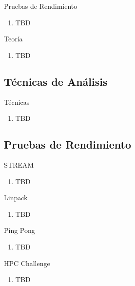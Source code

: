 \documentclass{beamer}
\begin{document}
\begin{frame}{Pruebas de Rendimiento}
	\begin{enumerate}
	\item TBD 
	\end{enumerate}
\end{frame}

\begin{frame}{Teoría}
	\begin{enumerate}
	\item TBD 
	\end{enumerate}
\end{frame}

\subsection{Técnicas de Análisis}

\begin{frame}{Técnicas}
	\begin{enumerate}
	\item TBD 
	\end{enumerate}
\end{frame}

\subsection{Pruebas de Rendimiento}

\begin{frame}{STREAM}
	\begin{enumerate}
	\item TBD 
	\end{enumerate}
\end{frame}

\begin{frame}{Linpack}
	\begin{enumerate}
	\item TBD 
	\end{enumerate}
\end{frame}

\begin{frame}{Ping Pong}
	\begin{enumerate}
	\item TBD 
	\end{enumerate}
\end{frame}

\begin{frame}{HPC Challenge}
	\begin{enumerate}
	\item TBD 
	\end{enumerate}
\end{frame}
\end{document}
